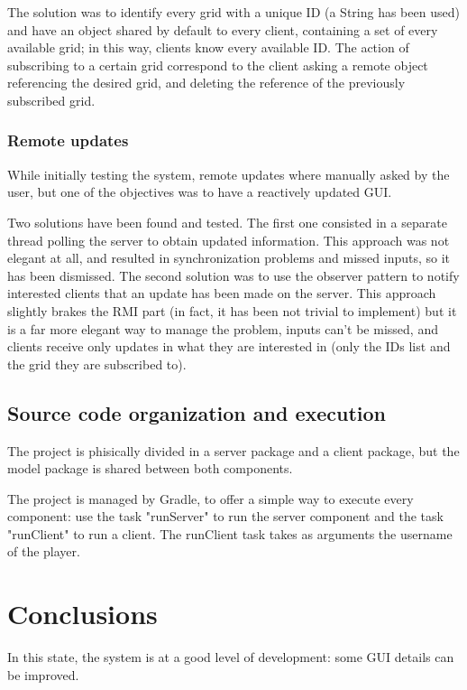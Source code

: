 \documentclass[12pt, a4paper]{report}
\begin{document}
The solution was to identify every grid with a unique ID (a String has been
 used) and have an object shared by default to every client, containing a set
 of every available grid; in this way, clients know every available ID. The
 action of subscribing to a certain grid correspond to the client asking a
 remote object referencing the desired grid, and deleting the reference of the
 previously subscribed grid.

\subsection{Remote updates}
While initially testing the system, remote updates where manually asked by the
 user, but one of the objectives was to have a reactively updated GUI.

Two solutions have been found and tested. The first one consisted in a separate
 thread polling the server to obtain updated information. This approach was not
 elegant at all, and resulted in synchronization problems and missed inputs, so
 it has been dismissed. The second solution was to use the observer pattern to
 notify interested clients that an update has been made on the server. This
 approach slightly brakes the RMI part (in fact, it has been not trivial to
 implement) but it is a far more elegant way to manage the problem, inputs
 can't be missed, and clients receive only updates in what they are interested
 in (only the IDs list and the grid they are subscribed to).

\section{Source code organization and execution}
The project is phisically divided in a server package and a client package, but
 the model package is shared between both components.

The project is managed by Gradle, to offer a simple way to execute every
 component: use the task "runServer" to run the server component and the task
 "runClient" to run a client. The runClient task takes as  arguments the
 username of the player.

\chapter{Conclusions}
In this state, the system is at a good level of development: some GUI details
 can be improved.



\end{document}

